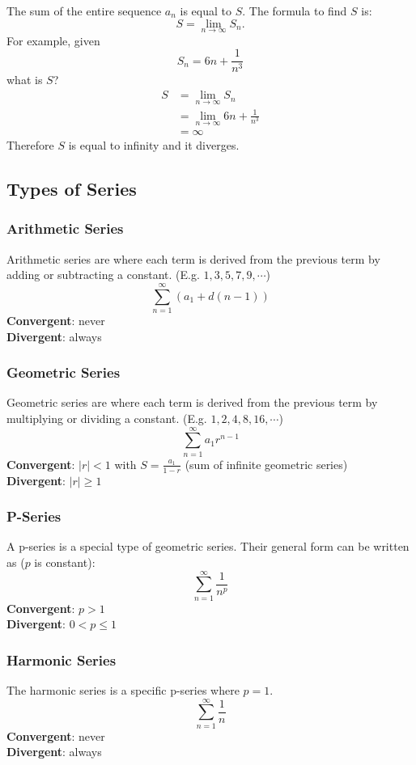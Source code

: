\documentclass[12pt]{article}
\begin{document}
The sum of the entire sequence $a_n$ is equal to $S$. The formula to find $S$ is:
\[ S = \lim_{n \to \infty} S_n. \]
For example, given
\[ S_n = 6n + \frac{1}{n^3} \]
what is $S$?
\begin{align*}
    S & = \lim_{n \to \infty} S_n                \\
      & = \lim_{n \to \infty} 6n + \frac{1}{n^3} \\[6pt]
      & = \infty
\end{align*}
Therefore $S$ is equal to infinity and it diverges.

\subsection{Types of Series}
\subsubsection{Arithmetic Series}
Arithmetic series are where each term is derived from the previous term by adding or subtracting a constant. (E.g. $1, 3, 5, 7, 9, \cdots$)
\[ \sum_{n=1}^\infty (a_1 + d(n-1)) \]
\textbf{Convergent}: never
\\ \textbf{Divergent}: always

\subsubsection{Geometric Series}
Geometric series are where each term is derived from the previous term by multiplying or dividing a constant. (E.g. $1, 2, 4, 8, 16, \cdots$)
\[ \sum_{n=1}^\infty a_1r^{n-1} \]
\textbf{Convergent}: $|r| < 1$ with $S = \frac{a_1}{1-r}$ (sum of infinite geometric series)
\\ \textbf{Divergent}: $|r| \ge 1$

\subsubsection{P-Series}
A p-series is a special type of geometric series. Their general form can be written as ($p$ is constant):
\[ \sum_{n=1}^\infty \frac{1}{n^p} \]
\textbf{Convergent}: $p > 1$
\\ \textbf{Divergent}: $0 < p \le 1$

\subsubsection{Harmonic Series}
The harmonic series is a specific p-series where $p=1$.
\[ \sum_{n=1}^\infty \frac{1}{n} \]
\textbf{Convergent}: never
\\ \textbf{Divergent}: always
\end{document}
